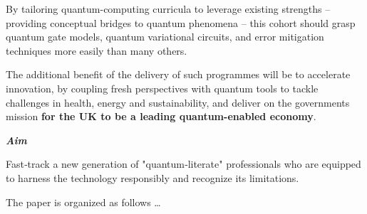By tailoring quantum-computing curricula to leverage existing strengths 
-- providing conceptual bridges to quantum phenomena -- 
this cohort should grasp quantum gate models, quantum variational circuits, and error mitigation techniques
more easily than many others.

The additional benefit of the delivery of such programmes will be to accelerate innovation, 
by coupling fresh perspectives with quantum tools to tackle challenges in health, energy and sustainability,
and deliver on the governments mission \textbf{for the UK to be a leading quantum-enabled economy}.


\textbf{\emph{Aim}}

Fast‑track a new generation of "quantum‑literate" professionals who are equipped to harness the technology responsibly and recognize its limitations.

The paper is organized as follows \ldots